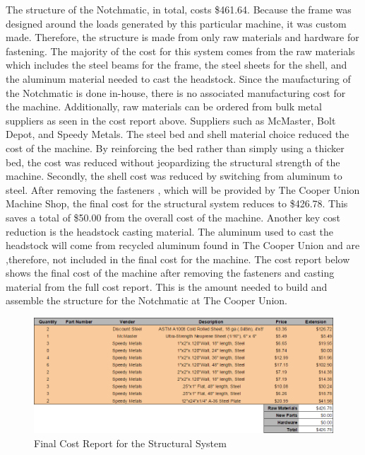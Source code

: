 The structure of the Notchmatic, in total, costs \$461.64. Because the frame was designed around the loads generated by this particular machine, it was custom made. Therefore, the structure is made from only raw materials and hardware for fastening. The majority of the cost for this system comes from the raw materials which includes the steel beams for the frame, the steel sheets for the shell, and the aluminum material needed to cast the headstock. Since the maufacturing of the Notchmatic is done in-house, there is no associated manufacturing cost for the machine. Additionally, raw materials can be ordered from bulk metal suppliers as seen in  the cost report above. Suppliers such as McMaster, Bolt Depot, and Speedy Metals. The steel bed and shell material choice reduced the cost of the machine. By reinforcing the bed rather than simply using a thicker bed, the cost was reduced without jeopardizing the structural strength of the machine. Secondly, the shell cost was reduced by switching from aluminum to steel. After removing the fasteners , which will be provided by The Cooper Union Machine Shop, the final cost for the structural system reduces to \$426.78. This saves a total of \$50.00 from the overall cost of the machine. Another key cost reduction is the headstock casting material. The aluminum used to cast the headstock will come from recycled aluminum found in The Cooper Union and are ,therefore, not included in the final cost for the machine. The cost report below shows the final cost of the machine after removing the fasteners and casting material from the full cost report. This is the amount needed to build and assemble the structure for the Notchmatic at The Cooper Union.

\begin{figure}[htp]
    \centering
    \includegraphics[width=1.0\textwidth]{./images/Chapter4-BillofMaterials/FCRS}
    \caption{Final Cost Report for the Structural System}
    \label{fig:FCRS}
\end{figure}


\newpage

